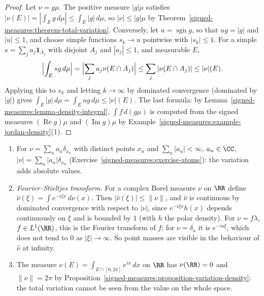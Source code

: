 \begin{proof}
Let $\nu = g\mu$. The positive measure $|g|\mu$ satisfies $|\nu(E)| = |\int_Eg\,d\mu| \leq \int_E|g|\,d\mu$, so $|\nu| \leq |g|\mu$ by Theorem~\ref{signed-measures:theorem-total-variation}. Conversely, let
$u = \overline{\operatorname{sgn}g}$, so that $ug = |g|$ and $|u| \leq 1$, and choose simple functions $s_k \to u$ pointwise with $|s_k| \leq 1$. For a simple $s = \sum_ja_j\mathbf{1}_{A_j}$ with disjoint
$A_j$ and $|a_j| \leq 1$, and measurable $E$,
\[
\Bigl|\int_Esg\,d\mu\Bigr| = \Bigl|\sum_ja_j\nu(E \cap A_j)\Bigr| \leq \sum_j|\nu(E \cap A_j)| \leq |\nu|(E).
\]
Applying this to $s_k$ and letting $k \to \infty$ by dominated convergence (dominated by $|g|$) gives $\int_E|g|\,d\mu = \int_Eug\,d\mu \leq |\nu|(E)$. The last formula: by
Lemma~\ref{signed-measures:lemma-density-integral}, $\int f\,d(g\mu)$ is computed from the signed measures $(\operatorname{Re}g)\mu$ and $(\operatorname{Im}g)\mu$ by
Example~\ref{signed-measures:example-jordan-density}(1).
\end{proof}

\begin{example}\label{signed-measures:example-complex-measures}
\begin{enumerate}
\item For $\nu = \sum_na_n\delta_{x_n}$ with distinct points $x_n$ and $\sum_n|a_n| < \infty$, $a_n \in \CC$, $|\nu| = \sum_n|a_n|\delta_{x_n}$ (Exercise~\ref{signed-measures:exercise-atoms}): the variation adds
absolute values.
\item \emph{Fourier--Stieltjes transform.} For a complex Borel measure $\nu$ on $\RR$ define $\hat\nu(\xi) = \int e^{-i\xi x}\,d\nu(x)$. Then $|\hat\nu(\xi)| \leq \|\nu\|$, and $\hat\nu$ is continuous by
dominated convergence with respect to $|\nu|$, since $e^{-i\xi x}h(x)$ depends continuously on $\xi$ and is bounded by $1$ (with $h$ the polar density). For $\nu = f\lambda$, $f \in L^1(\RR)$, this is the
Fourier transform of $f$; for $\nu = \delta_a$ it is $e^{-ia\xi}$, which does not tend to $0$ as $|\xi| \to \infty$. So point masses are visible in the behaviour of $\hat\nu$ at infinity.
\item The measure $\nu(E) = \int_{E \cap [0, 2\pi]}e^{ix}\,dx$ on $\RR$ has $\nu(\RR) = 0$ and $\|\nu\| = 2\pi$ by
Proposition~\ref{signed-measures:proposition-variation-density}: the total variation cannot be seen from the value on the whole space.
\end{enumerate}
\end{example}

